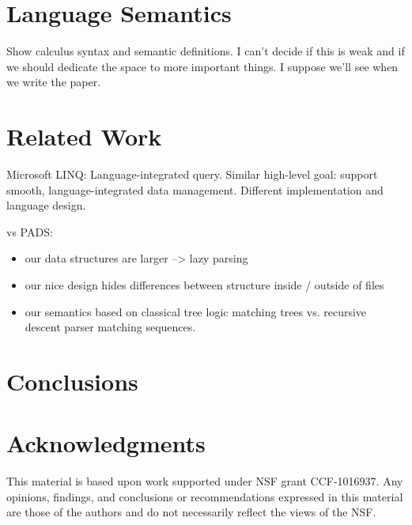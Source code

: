 \documentclass[natbib]{sigplanconf}
\begin{document}
\section{Language Semantics}
\label{sec:exp}

Show calculus syntax and semantic definitions.  I can't decide if this
is weak and if we should dedicate the space to more important things.
I suppose we'll see when we write the paper.

\section{Related Work}
\label{sec:related}

Microsoft LINQ: Language-integrated query.  Similar high-level goal:
support smooth, language-integrated data management.  Different 
implementation and language design.

vs PADS:  
\begin{itemize}
\item our data structures are larger --> lazy parsing
\item our nice design hides differences between structure inside /
outside of files
\item our semantics based on classical tree logic matching trees vs. 
recursive descent parser matching sequences.
\end{itemize}

\section{Conclusions}
\label{sec:conclusion}


\section*{Acknowledgments}

This material is based upon work 
supported under NSF grant CCF-1016937.
Any opinions, findings, and conclusions or recommendations
   expressed in this material are those of the authors and do not
   necessarily reflect the views of the NSF.


%



%
\end{document}
